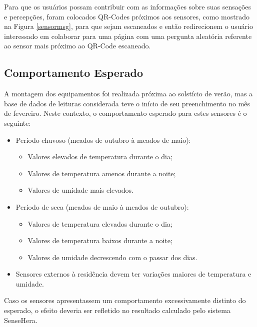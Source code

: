 \newpage
Para que os usuários possam contribuir com as informações sobre suas sensações e percepções, foram colocados QR-Codes próximos aos sensores, como mostrado na Figura \ref{sensormsg}, para que sejam escaneados e então redirecionem o usuário interessado em colaborar para uma página com uma pergunta aleatória referente ao sensor mais próximo ao QR-Code escaneado.


\subsection{Comportamento Esperado}
\quad A montagem dos equipamentos foi realizada próxima ao solstício de verão, mas a base de dados de leituras considerada teve o início de seu preenchimento no mês de fevereiro. Neste contexto, o comportamento esperado para estes sensores é o seguinte:
\begin{itemize}
  \item Período chuvoso (meados de outubro à meados de maio):
  \begin{itemize}
    \item Valores elevados de temperatura durante o dia;
    \item Valores de temperatura amenos durante a noite;
    \item Valores de umidade mais elevados.

  \end{itemize}
  \item Período de seca (meados de maio à meados de outubro):
  \begin{itemize}
    \item Valores de temperatura elevados durante o dia;
    \item Valores de temperatura baixos durante a noite;
    \item Valores de umidade decrescendo com o passar dos dias.
  \end{itemize}
  \item Sensores externos à residência devem ter variações maiores de temperatura e umidade.
\end{itemize}
\null \quad Caso os sensores apresentassem um comportamento excessivamente distinto do esperado, o efeito deveria ser refletido no resultado calculado pelo sistema SenseHera.

